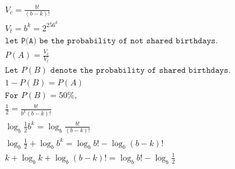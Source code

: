 \documentclass[11pt]{article}
\theoremstyle{definition}
\theoremstyle{remark}
\begin{document}
\[
\begin{aligned}
&V_c = \frac{b!}{(b-k)!} \\
&V_t = b^k = 2^{256^k} \\
&\texttt{let P(A) be the probability of not shared birthdays}.\\
&P(A) = \frac{V_c}{V_t} \\
&\texttt{Let $P(B)$ denote the probability of shared birthdays.}\\
&1-P(B) = P(A) \\
&\texttt{For $P(B) = 50\%$,} \\
&\frac{1}{2} = \frac{b!}{b^k(b-k)!}\\
&\log_b\frac{1}{2}b^k = \log_b\frac{b!}{(b-k)!} \\
&\log_b\frac{1}{2} + \log_bb^k = \log_bb! - \log_b(b-k)! \\
&k + \log_bk + \log_b(b-k)! = \log_bb! - \log_b\frac{1}{2} \\
\end{aligned}
\]
\thispagestyle{empty} %
\end{document}
